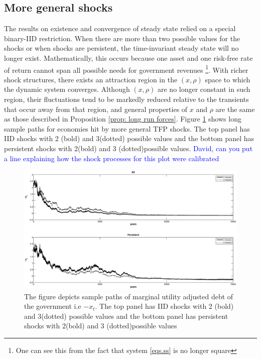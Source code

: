 \documentclass[thmsb,11pt]{article}
\begin{document}
\subsection{More general shocks} \label{Sec: More General Shocks}
The results on existence and convergence of steady state relied on a special binary-IID restriction. When there are more than two possible values for the shocks or when
shocks are persistent, the time-invariant steady state  will no longer
exist. Mathematically, this occurs because one asset and one risk-free rate
of return cannot span all possible needs for government revenues \footnote{One can see this from the fact that system \ref{eqs.ss} is no longer square}. With
richer shock structures, there exists an attraction region in the  $(x,\rho)$ space   to which the dynamic
system  converges. Although $\left( x,\rho \right) $ are no longer
constant in such region, their fluctuations tend to be markedly
reduced relative to the transients that occur away from that region, and general properties of $x$ and $\rho$ are the same as those
described in Proposition \ref{prop: long run forces}. Figure \ref{fig:moregeneralshocks} shows long sample paths for economies hit by more general TFP shocks. The top panel has IID shocks with 2 (bold) and 3(dotted) possible values and the bottom panel has persistent shocks with 2(bold) and 3 (dotted)possible values.
\textcolor{blue}{David, can you put a line explaining how the shock processes for this plot were calibrated}

% 
% 
   \begin{figure}[htp]
  \centering
  \includegraphics[width=\textwidth]{Draft25Graphs/generalshocks_x.eps}
  \caption{The figure depicts sample paths of marginal utility adjusted debt of the government i.e  $-x_t$. The top panel has IID shocks with 2 (bold) and 3(dotted) possible values and the bottom panel has persistent shocks with 2(bold) and 3 (dotted)possible values}
 \label{fig:moregeneralshocks}
  \end{figure}
\end{document}
